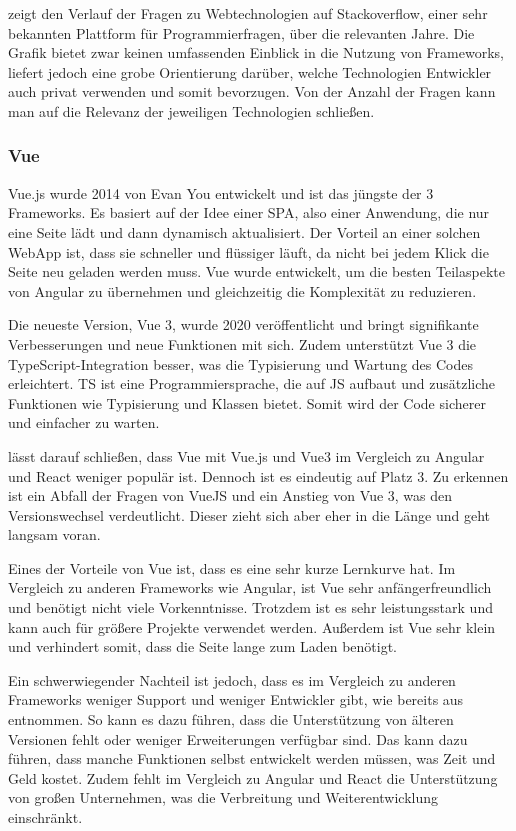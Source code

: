 \documentclass[biblatex]{lni}
\begin{document}
 zeigt den Verlauf der Fragen zu Webtechnologien auf Stackoverflow,
einer sehr bekannten Plattform für Programmierfragen, über die relevanten Jahre.
Die Grafik bietet zwar keinen umfassenden Einblick in die Nutzung von Frameworks,
liefert jedoch eine grobe Orientierung darüber, welche Technologien Entwickler auch privat verwenden und somit bevorzugen.
Von der Anzahl der Fragen kann man auf die Relevanz der jeweiligen Technologien schließen.

\subsubsection{Vue}
Vue.js wurde 2014 von Evan You entwickelt und ist das jüngste der 3 Frameworks. \cite{AmD}
Es basiert auf der Idee einer \ac{SPA}, also einer Anwendung, die nur eine Seite lädt und dann dynamisch aktualisiert. \cite{BStack}
Der Vorteil an einer solchen \ac{WebApp} ist, dass sie schneller und flüssiger läuft,
da nicht bei jedem Klick die Seite neu geladen werden muss.
Vue wurde entwickelt, um die besten Teilaspekte von Angular zu übernehmen und gleichzeitig die Komplexität zu reduzieren.

Die neueste Version, Vue 3,
wurde 2020 veröffentlicht und bringt signifikante Verbesserungen und neue Funktionen mit sich. \cite{vue}
Zudem unterstützt Vue 3 die TypeScript-Integration besser, was die Typisierung und Wartung des Codes erleichtert.
\ac{TS} ist eine Programmiersprache, die auf \ac{JS} aufbaut und zusätzliche Funktionen wie Typisierung und Klassen bietet. \cite{ts}
Somit wird der Code sicherer und einfacher zu warten.

 lässt darauf schließen,
dass Vue mit Vue.js und Vue3 im Vergleich zu Angular und React weniger populär ist.
Dennoch ist es eindeutig auf Platz 3.
Zu erkennen ist ein Abfall der Fragen von VueJS und ein Anstieg von Vue 3, was den Versionswechsel verdeutlicht.
Dieser zieht sich aber eher in die Länge und geht langsam voran.

Eines der Vorteile von Vue ist, dass es eine sehr kurze Lernkurve hat. \cite{Dev}
Im Vergleich zu anderen Frameworks wie Angular,
ist Vue sehr anfängerfreundlich und benötigt nicht viele Vorkenntnisse.
Trotzdem ist es sehr leistungsstark und kann auch für größere Projekte verwendet werden.
Außerdem ist Vue sehr klein und verhindert somit, dass die Seite lange zum Laden benötigt.

Ein schwerwiegender Nachteil ist jedoch, dass es im Vergleich zu anderen Frameworks weniger Support und weniger Entwickler gibt, wie bereits aus  entnommen. \cite{BStack}
So kann es dazu führen, dass die Unterstützung von älteren Versionen fehlt oder weniger Erweiterungen verfügbar sind.
Das kann dazu führen, dass manche Funktionen selbst entwickelt werden müssen, was Zeit und Geld kostet.
Zudem fehlt im Vergleich zu Angular und React die Unterstützung von großen Unternehmen, was die Verbreitung und Weiterentwicklung einschränkt.
\end{document}
